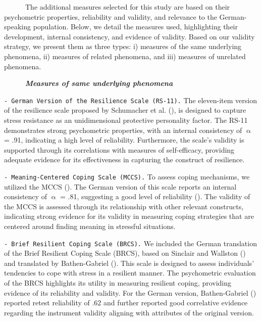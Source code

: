 \documentclass[
  man,floatsintext]{apa7}
\begin{document}
~~~~~~The additional measures selected for this study are based on their psychometric properties, reliability and validity, and relevance to the German-speaking population. Below, we detail the measures used, highlighting their development, internal consistency, and evidence of validity. Based on our validity strategy, we present them as three types: i) measures of the same underlying phenomena, ii) measures of related phenomena, and iii) measures of unrelated phenomena.

~~~~~~\textbf{\emph{Measures of same underlying phenomena}}

\texttt{-\ German\ Version\ of\ the\ Resilience\ Scale\ (RS-11).} The eleven-item version of the resilience scale proposed by Schumacher et al. (), is designed to capture stress resistance as an unidimensional protective personality factor. The RS-11 demonstrates strong psychometric properties, with an internal consistency of \(\upalpha\) = .91, indicating a high level of reliability. Furthermore, the scale's validity is supported through its correlations with measures of self-efficacy, providing adequate evidence for its effectiveness in capturing the construct of resilience.

\texttt{-\ Meaning-Centered\ Coping\ Scale\ (MCCS).} To assess coping mechanisms, we utilized the MCCS (). The German version of this scale reports an internal consistency of \(\upalpha\) = .81, suggesting a good level of reliability (). The validity of the MCCS is assessed through its relationship with other relevant constructs, indicating strong evidence for its validity in measuring coping strategies that are centered around finding meaning in stressful situations.

\texttt{-\ Brief\ Resilient\ Coping\ Scale\ (BRCS).} We included the German translation of the Brief Resilient Coping Scale (BRCS), based on Sinclair and Wallston () and translated by Bathen-Gabriel (). This scale is designed to assess individuals' tendencies to cope with stress in a resilient manner. The psychometric evaluation of the BRCS highlights its utility in measuring resilient coping, providing evidence of its reliability and validity. For the German version, Bathen-Gabriel () reported retest reliability of .62 and further reported good correlative evidence regarding the instrument validity aligning with attributes of the original version.
\end{document}
